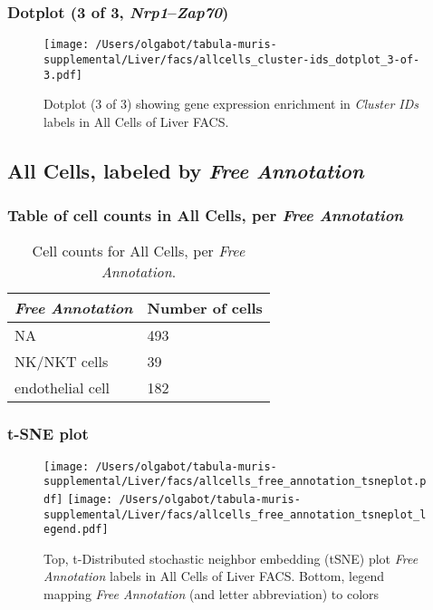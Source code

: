 \clearpage

\subsubsection{Dotplot (3 of 3, \emph{Nrp1}--\emph{Zap70})}
\begin{figure}[h]
\centering
\texttt{[image: /Users/olgabot/tabula-muris-supplemental/Liver/facs/allcells\_cluster-ids\_dotplot\_3-of-3.pdf]}

\caption{ Dotplot (3 of 3)  showing gene expression enrichment in \emph{Cluster IDs} labels in All Cells of Liver FACS. }
\end{figure}


\clearpage

\subsection{All Cells, labeled by \emph{Free Annotation}}
\subsubsection{Table of cell counts in All Cells, per \emph{Free Annotation}}\begin{table}[h]
\centering
\label{my-label}
\begin{tabular}{@{}ll@{}}
\toprule

\emph{Free Annotation}& Number of cells \\ \midrule
NA & 493 \\

NK/NKT cells & 39 \\

endothelial cell & 182 \\
\bottomrule
\end{tabular}
\caption{Cell counts for All Cells, per \emph{Free Annotation}.}
\end{table}

\clearpage
\subsubsection{t-SNE plot}
\begin{figure}[h]
\centering
\texttt{[image: /Users/olgabot/tabula-muris-supplemental/Liver/facs/allcells\_free\_annotation\_tsneplot.pdf]}
\texttt{[image: /Users/olgabot/tabula-muris-supplemental/Liver/facs/allcells\_free\_annotation\_tsneplot\_legend.pdf]}
\caption{Top, t-Distributed stochastic neighbor embedding (tSNE) plot  \emph{Free Annotation} labels in All Cells of Liver FACS. Bottom, legend mapping \emph{Free Annotation} (and letter abbreviation) to colors}
\end{figure}


